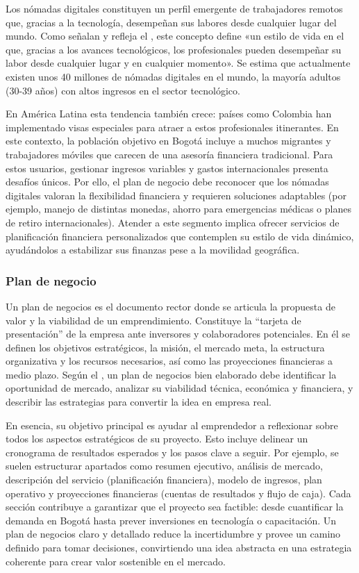 Los nómadas digitales constituyen un perfil emergente de trabajadores remotos que, gracias a la tecnología, desempeñan sus labores desde cualquier lugar del mundo. Como señalan \textcite{Recordar01} y refleja el \textcite{BBVA01}, este concepto define «un estilo de vida en el que, gracias a los avances tecnológicos, los profesionales pueden desempeñar su labor desde cualquier lugar y en cualquier momento». Se estima que actualmente existen unos 40 millones de nómadas digitales en el mundo, la mayoría adultos (30-39 años) con altos ingresos en el sector tecnológico.

En América Latina esta tendencia también crece: países como Colombia han implementado visas especiales para atraer a estos profesionales itinerantes. En este contexto, la población objetivo en Bogotá incluye a muchos migrantes y trabajadores móviles que carecen de una asesoría financiera tradicional. Para estos usuarios, gestionar ingresos variables y gastos internacionales presenta desafíos únicos. Por ello, el plan de negocio debe reconocer que los nómadas digitales valoran la flexibilidad financiera y requieren soluciones adaptables (por ejemplo, manejo de distintas monedas, ahorro para emergencias médicas o planes de retiro internacionales). Atender a este segmento implica ofrecer servicios de planificación financiera personalizados que contemplen su estilo de vida dinámico, ayudándolos a estabilizar sus finanzas pese a la movilidad geográfica.

{}
\subsubsection*{Plan de negocio}

Un plan de negocios es el documento rector donde se articula la propuesta de valor y la viabilidad de un emprendimiento. Constituye la ``tarjeta de presentación'' de la empresa ante inversores y colaboradores potenciales. En él se definen los objetivos estratégicos, la misión, el mercado meta, la estructura organizativa y los recursos necesarios, así como las proyecciones financieras a medio plazo. Según el \textcite{BBVA01}, un plan de negocios bien elaborado debe identificar la oportunidad de mercado, analizar su viabilidad técnica, económica y financiera, y describir las estrategias para convertir la idea en empresa real. 

En esencia, su objetivo principal es ayudar al emprendedor a reflexionar sobre todos los aspectos estratégicos de su proyecto. Esto incluye delinear un cronograma de resultados esperados y los pasos clave a seguir. Por ejemplo, se suelen estructurar apartados como resumen ejecutivo, análisis de mercado, descripción del servicio (planificación financiera), modelo de ingresos, plan operativo y proyecciones financieras (cuentas de resultados y flujo de caja). Cada sección contribuye a garantizar que el proyecto sea factible: desde cuantificar la demanda en Bogotá hasta prever inversiones en tecnología o capacitación. Un plan de negocios claro y detallado reduce la incertidumbre y provee un camino definido para tomar decisiones, convirtiendo una idea abstracta en una estrategia coherente para crear valor sostenible en el mercado.

